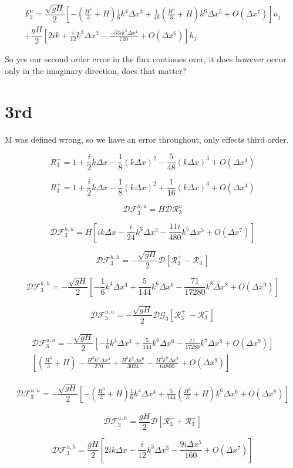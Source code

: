 \documentclass[12pt]{article}
\begin{document}
\begin{multline}
F^u_3 =  \dfrac{ \sqrt{gH}}{ 2} \left [-(\frac{H^3}{3} + H)\frac{1}{6} k^4 \Delta x^3 + \frac{1}{48}(\frac{H^3}{3} + H)k^6 \Delta x^5  + O(\Delta x ^7)\right]u_j\\ +\dfrac{ gH}{ 2}\left[2i k + \frac{i}{12} k^3 \Delta x^2 - \frac{-53 i k^5 \Delta x ^4}{720} + O(\Delta x ^6)\right]h_j
\end{multline}

So yes our second order error in the flux continues over, it does however occur only in the imaginary direction, does that matter?


\section{3rd}
M was defined wrong, so we have an error throughout, only effects third order. 

\[R_3^-= 1 + \frac{i}{2}k\Delta x - \frac{1}{8} (k \Delta x)^2 - \frac{5}{48} (k \Delta x)^3 +  O( \Delta x^4) \]

\[R_3^+= 1 + \frac{i}{2}k\Delta x - \frac{1}{8} (k \Delta x)^2 + \frac{1}{16} (k \Delta x)^3 +  O( \Delta x^4)\] 

\[\mathcal{D}\mathcal{F}_3^{h,u} = H\mathcal{D}\mathcal{R}_3^u\]

\[\mathcal{D}\mathcal{F}_3^{h,u} = H\left[i k \Delta x - \frac{i}{24} k^3 \Delta x ^3 - \frac{11i}{480 }k^5 \Delta x ^5 + O(\Delta x ^7) \right]\]

\[\mathcal{D}\mathcal{F}_3^{h,h} = -\dfrac{ \sqrt{gH}}{ 2}  \mathcal{D}\left [ \mathcal{R}_3^+- \mathcal{R}_3^- \right ]\]

\[\mathcal{D}\mathcal{F}_3^{h,h} = -\dfrac{ \sqrt{gH}}{ 2}  \left[ -\frac{1}{6} k^4 \Delta x^4 + \frac{5}{144}k^6 \Delta x^6 - \frac{71}{17280}k^8 \Delta x^8 + O(\Delta x ^9) \right]\]


\[\mathcal{D}\mathcal{F}_3^{u,u} = - \dfrac{ \sqrt{gH}}{ 2} \mathcal{D}\mathcal{G}_3 \left [ \mathcal{R}_3^+ \ -  \mathcal{R}_3^-  \right]\]

\begin{multline}
\mathcal{D}\mathcal{F}_3^{u,u} = - \dfrac{ \sqrt{gH}}{ 2} \left[ -\frac{1}{6} k^4 \Delta x^4 + \frac{5}{144}k^6 \Delta x^6 - \frac{71}{17280}k^8 \Delta x^8 + O(\Delta x ^9) \right] \\ 
\left[(\frac{H^3}{3} + H) - \frac{H^3 k^4 \Delta x^4}{270} + \frac{H^3 k^6 \Delta x^6}{3024} - \frac{H^3 k^8 \Delta x^8}{64800} + O(\Delta x ^9)\right]
\end{multline}

\begin{multline}
\mathcal{D}\mathcal{F}_3^{u,u} = - \dfrac{ \sqrt{gH}}{ 2} \left [-(\frac{H^3}{3} + H)\frac{1}{6} k^4 \Delta x^4 + \frac{5}{144}(\frac{H^3}{3} + H)k^6 \Delta x^6  + O(\Delta x ^8)\right]
\end{multline}


\[\mathcal{D}\mathcal{F}_3^{u,h} = \dfrac{ gH}{ 2}\mathcal{D} [\mathcal{R}_3^- + \mathcal{R}_3^+] \]

\[\mathcal{D}\mathcal{F}_3^{u,h} = \dfrac{ gH}{ 2} \left[2i k \Delta x - \frac{i}{12} k^3 \Delta x^3 - \frac{9 i \Delta x ^5}{160} + O(\Delta x ^7)\right] \]
\end{document}
